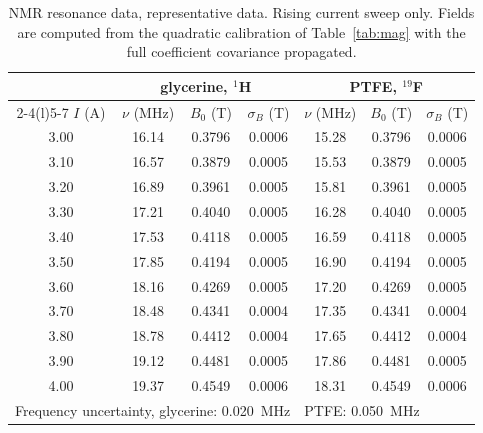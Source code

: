 \documentclass[11pt,a4paper]{article}
\begin{document}
\begin{table}[H]
\centering
\caption{NMR resonance data, representative data. Rising current sweep only. Fields are computed
from the quadratic calibration of Table~\ref{tab:mag} with the full coefficient covariance
propagated.}
\label{tab:a4}
\scriptsize
\begin{tabular}{cccc@{\hspace{1.4cm}}ccc}
\toprule
 & \multicolumn{3}{c}{glycerine, $^{1}$H} & \multicolumn{3}{c}{PTFE, $^{19}$F} \\
\cmidrule(r){2-4}\cmidrule(l){5-7}
$I$ (\si{\ampere}) & $\nu$ (\si{\mega\hertz}) & $B_0$ (\si{\tesla}) & $\sigma_B$ (\si{\tesla}) & $\nu$ (\si{\mega\hertz}) & $B_0$ (\si{\tesla}) & $\sigma_B$ (\si{\tesla}) \\
\midrule
3.00 & 16.14 & 0.3796 & 0.0006 & 15.28 & 0.3796 & 0.0006 \\
3.10 & 16.57 & 0.3879 & 0.0005 & 15.53 & 0.3879 & 0.0005 \\
3.20 & 16.89 & 0.3961 & 0.0005 & 15.81 & 0.3961 & 0.0005 \\
3.30 & 17.21 & 0.4040 & 0.0005 & 16.28 & 0.4040 & 0.0005 \\
3.40 & 17.53 & 0.4118 & 0.0005 & 16.59 & 0.4118 & 0.0005 \\
3.50 & 17.85 & 0.4194 & 0.0005 & 16.90 & 0.4194 & 0.0005 \\
3.60 & 18.16 & 0.4269 & 0.0005 & 17.20 & 0.4269 & 0.0005 \\
3.70 & 18.48 & 0.4341 & 0.0004 & 17.35 & 0.4341 & 0.0004 \\
3.80 & 18.78 & 0.4412 & 0.0004 & 17.65 & 0.4412 & 0.0004 \\
3.90 & 19.12 & 0.4481 & 0.0005 & 17.86 & 0.4481 & 0.0005 \\
4.00 & 19.37 & 0.4549 & 0.0006 & 18.31 & 0.4549 & 0.0006 \\
\midrule
\multicolumn{4}{l}{Frequency uncertainty, glycerine: \SI{0.020}{\mega\hertz}} &
\multicolumn{3}{l}{PTFE: \SI{0.050}{\mega\hertz}} \\
\bottomrule
\end{tabular}
\end{table}
\end{document}
